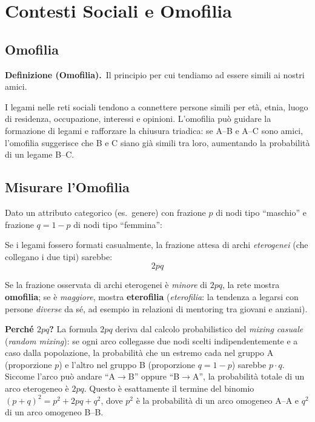 \documentclass[12pt,a4paper]{article}
\newcommand{\definition}[2]{%
  \vspace{4pt}%
  \noindent\textbf{Definizione (#1).}\ #2\par\vspace{4pt}%
}
\newcommand{\formula}[1]{%
  \begin{equation*}#1\end{equation*}%
}
\begin{document}
\section{Contesti Sociali e Omofilia}

\subsection{Omofilia}

\definition{Omofilia}{Il principio per cui tendiamo ad essere simili ai nostri amici.}

I legami nelle reti sociali tendono a connettere persone simili per età, etnia, luogo di
residenza, occupazione, interessi e opinioni. L'omofilia può guidare la formazione di legami
e rafforzare la chiusura triadica: se A–B e A–C sono amici, l'omofilia suggerisce che B e C
siano già simili tra loro, aumentando la probabilità di un legame B–C.

\subsection{Misurare l'Omofilia}

Dato un attributo categorico (es.\ genere) con frazione $p$ di nodi tipo ``maschio'' e
frazione $q = 1-p$ di nodi tipo ``femmina'':

Se i legami fossero formati casualmente, la frazione attesa di archi \emph{eterogenei}
(che collegano i due tipi) sarebbe:
\formula{2pq}

Se la frazione osservata di archi eterogenei è \emph{minore} di $2pq$, la rete
mostra \textbf{omofilia}; se è \emph{maggiore}, mostra \textbf{eterofilia}
(\textit{eterofilia}: la tendenza a legarsi con persone \emph{diverse} da sé,
ad esempio in relazioni di mentoring tra giovani e anziani).

\medskip
\noindent\textbf{Perché $2pq$?}
La formula $2pq$ deriva dal calcolo probabilistico del \emph{mixing casuale} (\textit{random
mixing}): se ogni arco collegasse due nodi scelti indipendentemente e a caso dalla
popolazione, la probabilità che un estremo cada nel gruppo A (proporzione $p$) e l'altro
nel gruppo B (proporzione $q = 1-p$) sarebbe $p \cdot q$. Siccome l'arco può andare
``A$\to$B'' oppure ``B$\to$A'', la probabilità totale di un arco eterogeneo è $2pq$.
Questo è esattamente il termine del binomio $(p+q)^2 = p^2 + 2pq + q^2$, dove $p^2$
è la probabilità di un arco omogeneo A–A e $q^2$ di un arco omogeneo B–B.
\end{document}
